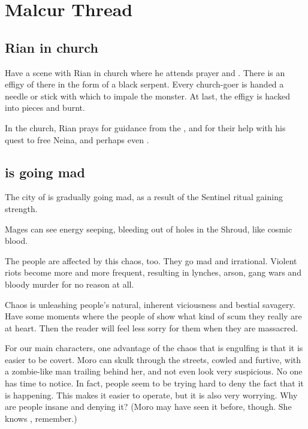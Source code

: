 \section{Malcur Thread}









\subsection{Rian in church}
Have a scene with Rian in church where he attends prayer and . 
There is an effigy of \Isphet there in the form of a black serpent. 
Every church-goer is handed a needle or stick with which to impale the monster. 
At last, the effigy is hacked into pieces and burnt. 

In the church, Rian prays for guidance from the \sephiroth, and for their help with his quest to free Neina, and perhaps even . 









\subsection[Malcur is going mad]{\Malcur is going mad}
The city of \Malcur is gradually going mad, as a result of the Sentinel ritual gaining strength. 

Mages can see energy seeping, bleeding out of holes in the Shroud, like cosmic blood. 

The people are affected by this chaos, too. They go mad and irrational. Violent riots become more and more frequent, resulting in lynches, arson, gang wars and bloody murder for no reason at all. 

Chaos is unleashing people's natural, inherent viciousness and bestial savagery. 
Have some  moments where the people of \Malcur show what kind of scum they really are at heart. 
Then the reader will feel less sorry for them when they are massacred. 

For our main characters, one advantage of the chaos that is engulfing \Malcur is that it is easier to be covert. 
Moro \Cobrel can skulk through the streets, cowled and furtive, with a zombie-like man trailing behind her, and not even look very suspicious. 
No one has time to notice. 
In fact, people seem to be trying hard to deny the fact that it is happening. 
This makes it easier to operate, but it is also very worrying.
Why are people insane and denying it?
(Moro may have seen it before, though. She knows \Ubloth, remember.)

